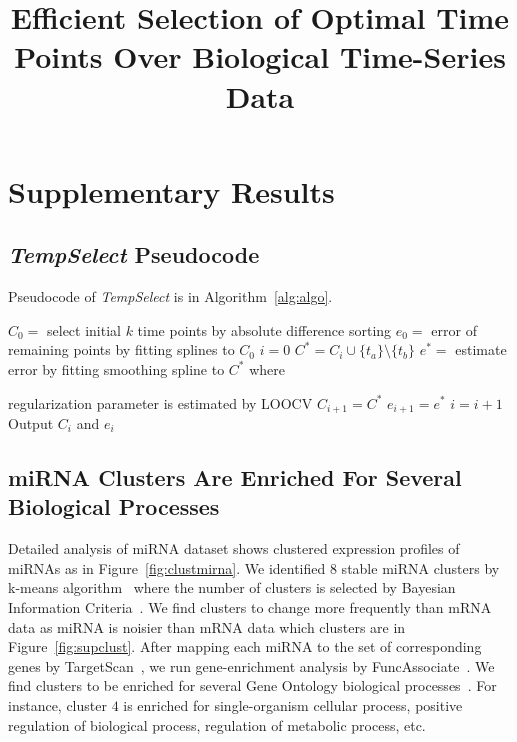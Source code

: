 \documentclass[10pt]{article}
\newcommand{\Tempselect}{\textit{TempSelect}\xspace}
\begin{document}
\title{Efficient Selection of Optimal Time Points Over Biological Time-Series Data}
\date{}

\maketitle


\section{Supplementary Results}


\subsection{\Tempselect Pseudocode}

Pseudocode of \Tempselect is in Algorithm~\ref{alg:algo}.

\begin{algorithm}
\caption{\Tempselect: Iterative $k$-point selection}
\label{alg:algo}
\begin{algorithmic}[1]
\State $C_{0} = $ select initial $k$ time points by absolute difference sorting
\State $e_{0} = $ error of remaining points by fitting splines to $C_{0}$
\State $i=0$
\Do 
{}
\State $C^{*} = C_{i} \cup \{ t_{a} \} \setminus \{ t_{b}\}$ 
\State $e^{*} = $ estimate error by fitting smoothing spline to
$C^{*}$ where \par 
\hspace{1.62cm} regularization parameter is estimated by LOOCV
\State $C_{i+1} = C^{*}$ 
\State $e_{i+1} = e^{*}$
\EndIf
\State $i = i+1$
\EndFor
{}
\State Output $C_{i}$ and $e_{i}$
\EndProcedure
\end{algorithmic}
\end{algorithm}


\subsection{miRNA Clusters Are Enriched For Several Biological Processes}\label{sec:mirna}

Detailed analysis of miRNA dataset shows clustered expression profiles
of miRNAs as in Figure~\ref{fig:clustmirna}. We identified $8$ stable miRNA
clusters by k-means algorithm~\cite{kmeans} where the number of clusters is selected by
Bayesian Information Criteria~\cite{bic}. We find clusters to change more frequently
than mRNA data as miRNA is noisier than mRNA data which clusters are in Figure~\ref{fig:supclust}. After mapping each miRNA to
the set of corresponding genes by TargetScan~\cite{agarwal2015}, we run
gene-enrichment analysis by FuncAssociate~\cite{berriz2003}. We find clusters to be enriched
for several Gene Ontology biological processes~\cite{go}. For
instance, cluster $4$ is enriched for single-organism cellular
process, positive regulation of biological process, regulation of
metabolic process, etc.
\end{document}
